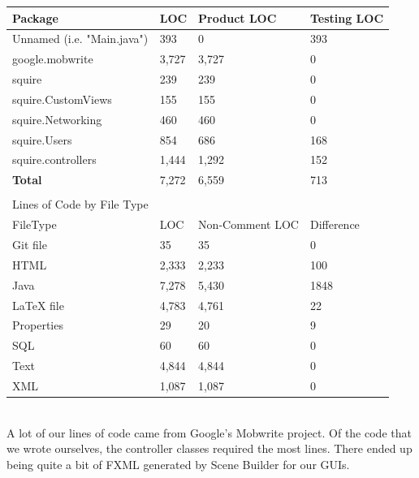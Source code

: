 \documentclass[twoside,letterpaper]{article}
\begin{document}
\begin{tabular}{|l|l|l|l|}
\hline
Package                    & LOC   & Product LOC     & Testing LOC \\ \hline
Unnamed (i.e. "Main.java") & 393   & 0               & 393         \\ \hline
google.mobwrite            & 3,727 & 3,727           & 0           \\ \hline
squire                     & 239   & 239             & 0           \\ \hline
squire.CustomViews         & 155   & 155             & 0           \\ \hline
squire.Networking          & 460   & 460             & 0           \\ \hline
squire.Users               & 854   & 686             & 168         \\ \hline
squire.controllers         & 1,444 & 1,292           & 152         \\ \hline
\textbf{Total}			   &	7,272 & 6,559		    & 713		\\ \hline
                           &       &                 &             \\ \hline
Lines of Code by File Type &       &                 &             \\ \hline
FileType                   & LOC   & Non-Comment LOC & Difference  \\ \hline
Git file                   & 35    & 35              & 0           \\ \hline
HTML                       & 2,333 & 2,233           & 100         \\ \hline
Java                       & 7,278 & 5,430           & 1848        \\ \hline
LaTeX file                 & 4,783 & 4,761           & 22          \\ \hline
Properties                 & 29    & 20              & 9           \\ \hline
SQL                        & 60    & 60              & 0           \\ \hline
Text                       & 4,844 & 4,844           & 0           \\ \hline
XML                        & 1,087 & 1,087           & 0           \\ \hline
\end{tabular}
\\ \noindent A lot of our lines of code came from Google's Mobwrite project. Of the code that we wrote ourselves, the controller classes required the most lines. There ended up being quite a bit of FXML generated by Scene Builder for our GUIs.
\end{document}
